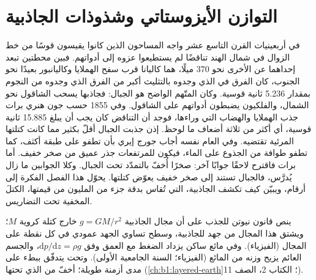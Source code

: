 \chapter{التوازن الأيزوستاتي وشذوذات الجاذبية}\label{ch:b1:isostasy-gravity}

في أربعينيات القرن التاسع عشر واجه المساحون الذين كانوا يقيسون قوسًا من خط الزوال في شمال الهند تناقضًا لم يستطيعوا عزوه إلى أدواتهم. فبين محطتين تبعد إحداهما عن الأخرى نحو 370 ميلًا، هما كاليانا قرب سفح الهملايا وكاليانبور بعيدًا نحو الجنوب، كان الفرق في  الذي وجدوه بالتثليث أكبر من الفرق الذي وجدوه من النجوم بمقدار \num{5.236} ثانية قوسية. وكان المتّهم الواضح هو الجبال: فجاذبها يسحب الشاقول نحو الشمال، والفلكيون يضبطون أدواتهم على الشاقول. وفي 1855 حسب جون هنري برات جذب الهملايا والهضاب التي وراءها، فوجد أن التناقض كان يجب أن يبلغ \num{15.885} ثانية قوسية، أي أكثر من ثلاثة أضعاف ما لوحظ. إذن جذبت الجبال أقلّ بكثير مما كانت كتلتها المرئية تقتضيه. وفي العام نفسه أجاب جورج إيري بأن  تطفو على طبقة أكثف، كما تطفو طوافة من الجذوع على الماء، فيكون للمرتفعات جذر عميق من صخر خفيف. أما برات فاقترح لاحقًا جوابًا آخر: صخرًا أُخفّ بالتمدّد تحت الجبال. وكلا الجوابين ما زال يُدرَّس، فالجبال تستند إلى صخر خفيف يعوّض كتلتها. يحوّل هذا الفصل الفكرة إلى أرقام، ويبيّن كيف تكشف الجاذبية، التي تُقاس بدقة جزء من المليون من قيمتها، الكتلَ المخفية تحت التضاريس.

\begin{recall}
ينص قانون نيوتن للجذب على أن مجال الجاذبية $g = GM/r^2$ خارج كتلة كروية $M$؛ ويشتق هذا المجال من جهد للجاذبية، وسطح تساوي الجهد عمودي في كل نقطة على المجال (الفيزياء). وفي مائع ساكن يزداد الضغط مع العمق وفق $\mathrm dp/\mathrm dz = \rho g$، والجسم العائم يزيح وزنه من المائع (الفيزياء؛ السنة الجامعية الأولى). وتحت  يتدفّق  ببطء على مدى أزمنة طويلة؛  أخفّ من  الذي تحتها (\cref{ch:b1:layered-earth}؛ الكتاب 2، الصف 11).
\end{recall}

